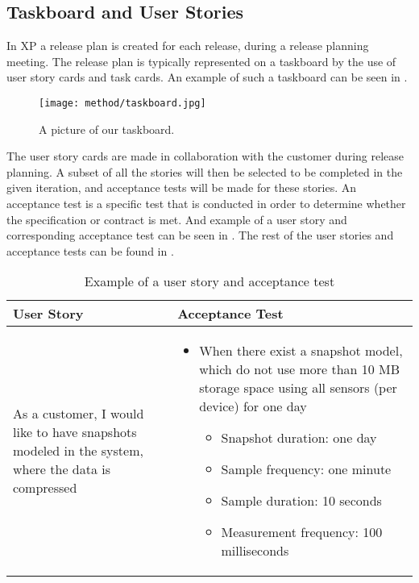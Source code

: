 \subsection{Taskboard and User Stories}
\label{sub:taskboard_and_user_stories}
In XP a release plan is created for each release, during a release planning meeting. The release plan is typically represented on a taskboard by the use of user story cards and task cards. An example of such a taskboard can be seen in .

\begin{figure}[!htbp]
    \centering
    \texttt{[image: method/taskboard.jpg]}
    \caption{A picture of our taskboard.}
    \label{fig:taskboard}
\end{figure}

The user story cards are made in collaboration with the customer during release planning.  A subset of all the stories will then be selected to be completed in the given iteration, and acceptance tests will be made for these stories. An acceptance test is a specific test that is conducted in order to determine whether the specification or contract is met. And example of a user story and corresponding acceptance test can be seen in . The rest of the user stories and acceptance tests can be found in .

\begin{table}[!htbp]
    \begin{tabular}{| m{} | m{} |}
        \hline
        \textbf{User Story} & \textbf{Acceptance Test} \\ \hline
        As a customer, I would like to have snapshots modeled in the system, where the data is compressed & 
        \begin{itemize}[noitemsep,parsep=0pt,partopsep=0pt]
            \item When there exist a snapshot model, which do not use more than 10 MB storage space using all sensors (per device) for one day
                \begin{itemize}[noitemsep,topsep=0pt,parsep=0pt,partopsep=0pt]
                    \item Snapshot duration: one day
                    \item Sample frequency: one minute
                    \item Sample duration: 10 seconds
                    \item Measurement frequency: 100 milliseconds
                \end{itemize}
         \end{itemize} \\ \hline
    \end{tabular}
    \caption{Example of a user story and acceptance test}
    \label{tab:user_story_acceptance_test_example}
\end{table}
\FloatBarrier

